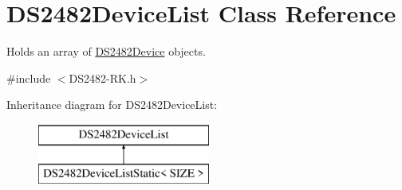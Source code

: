 \hypertarget{class_d_s2482_device_list}{}\section{D\+S2482\+Device\+List Class Reference}
\label{class_d_s2482_device_list}


Holds an array of \mbox{\hyperlink{class_d_s2482_device}{D\+S2482\+Device}} objects.  




{\ttfamily \#include $<$D\+S2482-\/\+R\+K.\+h$>$}

Inheritance diagram for D\+S2482\+Device\+List\+:\begin{figure}[H]
\begin{center}
\leavevmode
\includegraphics[height=2.000000cm]{class_d_s2482_device_list}
\end{center}
\end{figure}
